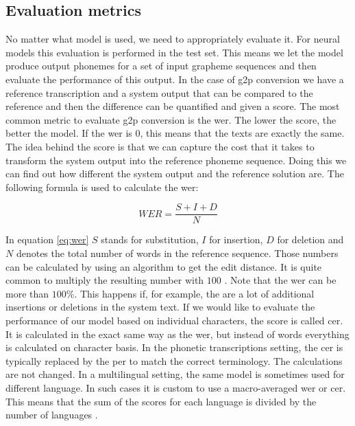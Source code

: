 \subsection*{Evaluation metrics}
No matter what model is used, we need to appropriately evaluate it. For neural models this evaluation is performed in the test set. This means we let the model produce output phonemes for a set of input grapheme sequences and then evaluate the performance of this output. In the case of \ac{g2p} conversion we have a reference transcription and a system output that can be compared to the reference and then the difference can be quantified and given a score. The most common metric to evaluate \ac{g2p} conversion is the \ac{wer}. The lower the score, the better the model. If the \ac{wer} is 0, this means that the texts are exactly the same. The idea behind the score is that we can capture the cost that it takes to transform the system output into the reference phoneme sequence. Doing this we can find out how different the system output and the reference solution are. The following formula is used to calculate the \ac{wer}:    

\begin{equation}
\label{eq:wer}
WER = \frac{S+I+D}{N}
\end{equation} 


In equation \ref{eq:wer} $S$ stands for substitution, $I$ for insertion, $D$ for deletion and $N$ denotes the total number of words in the reference sequence. Those numbers can be calculated by using an algorithm to get the edit distance. It is quite common to multiply the resulting number with $100$ \citep{gorman-etal-2020-sigmorphon}. Note that the \ac{wer} can be more than $100$\%. This happens if, for example, the are a lot of additional insertions or deletions in the system text. If we would like to evaluate the performance of our model based on individual characters, the score is called \acf{cer}. It is calculated in the exact same way as the \ac{wer}, but instead of words everything is calculated on character basis. In the phonetic transcriptions setting, the \ac{cer} is typically replaced by the \acf{per} to match the correct terminology. The calculations are not changed. In a multilingual setting, the same model is sometimes used for different language. In such cases it is custom to use a macro-averaged \ac{wer} or \ac{cer}. This means that the sum of the scores for each language is divided by the number of languages \citep{Leung.2021}.

